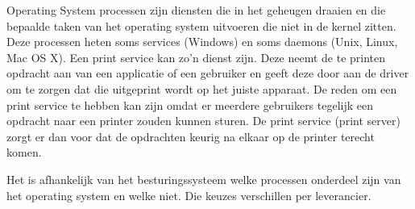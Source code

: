 Operating System processen zijn diensten die in het geheugen draaien en die bepaalde taken van het operating system uitvoeren die niet in de kernel zitten. Deze processen heten soms services (Windows) en soms daemons (Unix, Linux, Mac OS X). Een print service kan zo'n dienst zijn. Deze neemt de te printen opdracht aan van een applicatie of een gebruiker en geeft deze door aan de driver om te zorgen dat die uitgeprint wordt op het juiste apparaat. De reden om een print service te hebben kan zijn omdat er meerdere gebruikers tegelijk een opdracht naar een printer zouden kunnen sturen. De print service (print server) zorgt er dan voor dat de opdrachten keurig na elkaar op de printer terecht komen.

Het is afhankelijk van het besturingssysteem welke processen onderdeel zijn van het operating system en welke niet. Die keuzes verschillen per leverancier.

